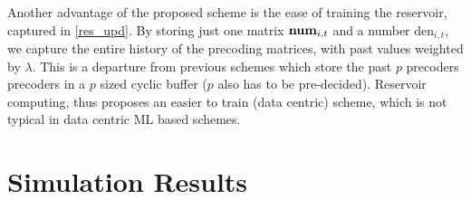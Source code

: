\documentclass[conference]{IEEEtran}
\newcommand{\highlight}[1]{%
  \colorbox{red!50}{$\displaystyle#1$}}
\begin{document}

{Another advantage of the proposed scheme is the ease of training the reservoir, captured in \eqref{res_upd}.
By storing just one matrix $\text{\textbf{num}}_{i,t}$ and a number $\text{den}_{i,t}$, we capture the entire history of the precoding matrices, with past values weighted by $\lambda$.
This is a departure from previous schemes \cite{Gupt1905:Predictive,6891198,6545375} which store the past $p$ precoders precoders in a $p$ sized cyclic buffer ($p$ also has to be pre-decided).
Reservoir computing, thus proposes an easier to train (data centric) scheme, which is not typical in data centric ML based schemes.
}

\vspace{-4pt}
\section{Simulation Results}
\label{section4}
\end{document}

